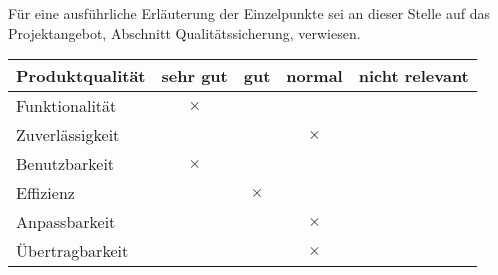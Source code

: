 Für eine ausführliche Erläuterung der Einzelpunkte sei an dieser Stelle auf das Projektangebot, Abschnitt Qualitätssicherung, verwiesen.
\begin{table}[!h]
  \sffamily
  \begin{tabular}{l c c c c}
    \toprule
    \textbf{Produktqualität} & \textbf{sehr gut} & \textbf{gut} & \textbf{normal} & \textbf{nicht relevant} \\\midrule

    Funktionalität & $\times$ \\
    Zuverlässigkeit &&& $\times$ \\
    Benutzbarkeit &  $\times$ \\
    Effizienz  && $\times$ \\
    Anpassbarkeit &&& $\times$ \\
    Übertragbarkeit &&& $\times$ \\
    \bottomrule
  \end{tabular}
\end{table}


